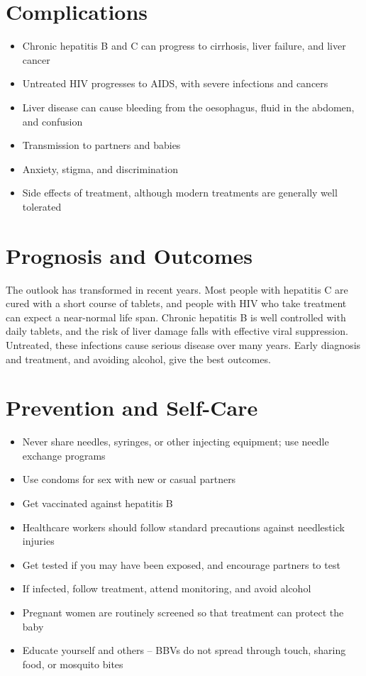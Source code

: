 \section*{Complications}
\begin{itemize}
    \item Chronic hepatitis B and C can progress to cirrhosis, liver failure, and liver cancer
    \item Untreated HIV progresses to AIDS, with severe infections and cancers
    \item Liver disease can cause bleeding from the oesophagus, fluid in the abdomen, and confusion
    \item Transmission to partners and babies
    \item Anxiety, stigma, and discrimination
    \item Side effects of treatment, although modern treatments are generally well tolerated
\end{itemize}

\section*{Prognosis and Outcomes}
The outlook has transformed in recent years. Most people with hepatitis C are cured with a short course of tablets, and people with HIV who take treatment can expect a near-normal life span. Chronic hepatitis B is well controlled with daily tablets, and the risk of liver damage falls with effective viral suppression. Untreated, these infections cause serious disease over many years. Early diagnosis and treatment, and avoiding alcohol, give the best outcomes.

\section*{Prevention and Self-Care}
\begin{itemize}
    \item Never share needles, syringes, or other injecting equipment; use needle exchange programs
    \item Use condoms for sex with new or casual partners
    \item Get vaccinated against hepatitis B
    \item Healthcare workers should follow standard precautions against needlestick injuries
    \item Get tested if you may have been exposed, and encourage partners to test
    \item If infected, follow treatment, attend monitoring, and avoid alcohol
    \item Pregnant women are routinely screened so that treatment can protect the baby
    \item Educate yourself and others -- BBVs do not spread through touch, sharing food, or mosquito bites
\end{itemize}

